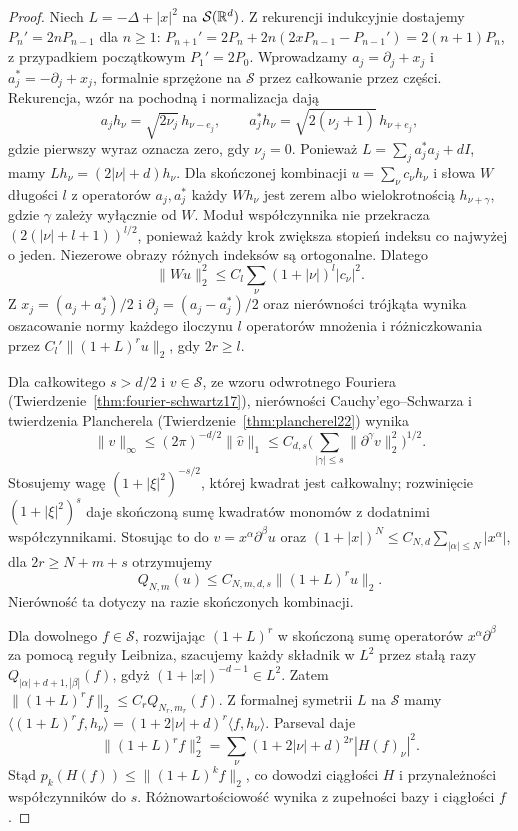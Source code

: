 \begin{proof}
Niech $L=-\Delta+|x|^2$ na $\mathcal S(\mathbb R^d)$.
Z rekurencji indukcyjnie dostajemy $P_n'=2nP_{n-1}$ dla $n\ge1$:
$P_{n+1}'=2P_n+2n(2xP_{n-1}-P_{n-1}')=2(n+1)P_n$,
z przypadkiem początkowym $P_1'=2P_0$.
Wprowadzamy $a_j=\partial_j+x_j$ i $a_j^*=-\partial_j+x_j$,
formalnie sprzężone na $\mathcal S$ przez całkowanie przez części.
Rekurencja, wzór na pochodną i normalizacja dają
\[
 a_jh_\nu=\sqrt{2\nu_j}\,h_{\nu-e_j},\qquad
 a_j^*h_\nu=\sqrt{2(\nu_j+1)}\,h_{\nu+e_j},
\]
gdzie pierwszy wyraz oznacza zero, gdy $\nu_j=0$.
Ponieważ $L=\sum_j a_j^*a_j+dI$, mamy
$Lh_\nu=(2|\nu|+d)h_\nu$.
Dla skończonej kombinacji $u=\sum_\nu c_\nu h_\nu$
i słowa $W$ długości $l$ z operatorów $a_j,a_j^*$
każdy $Wh_\nu$ jest zerem albo wielokrotnością
$h_{\nu+\gamma}$, gdzie $\gamma$ zależy wyłącznie od $W$.
Moduł współczynnika nie przekracza
$(2(|\nu|+l+1))^{l/2}$, ponieważ każdy krok zwiększa
stopień indeksu co najwyżej o jeden.
Niezerowe obrazy różnych indeksów są ortogonalne.
Dlatego
\[
 \|Wu\|_2^2\le C_l\sum_\nu(1+|\nu|)^l|c_\nu|^2.
\]
Z $x_j=(a_j+a_j^*)/2$ i $\partial_j=(a_j-a_j^*)/2$
oraz nierówności trójkąta wynika oszacowanie normy
każdego iloczynu $l$ operatorów mnożenia i różniczkowania
przez $C_l'\|(1+L)^r u\|_2$, gdy $2r\ge l$.

Dla całkowitego $s>d/2$ i $v\in\mathcal S$, ze wzoru
odwrotnego Fouriera (Twierdzenie~\ref{thm:fourier-schwartz17}),
nierówności Cauchy'ego--Schwarza i twierdzenia
Plancherela (Twierdzenie~\ref{thm:plancherel22}) wynika
\[
 \|v\|_\infty\le (2\pi)^{-d/2}\|\widehat v\|_1
 \le C_{d,s}\Big(\sum_{|\gamma|\le s}
 \|\partial^\gamma v\|_2^2\Big)^{1/2}.
\]
Stosujemy wagę $(1+|\xi|^2)^{-s/2}$, której kwadrat
jest całkowalny; rozwinięcie $(1+|\xi|^2)^s$ daje
skończoną sumę kwadratów monomów z dodatnimi współczynnikami.
Stosując to do $v=x^\alpha\partial^\beta u$ oraz
$(1+|x|)^N\le C_{N,d}\sum_{|\alpha|\le N}|x^\alpha|$,
dla $2r\ge N+m+s$ otrzymujemy
\[
 Q_{N,m}(u)\le C_{N,m,d,s}\|(1+L)^r u\|_2.
\]
Nierówność ta dotyczy na razie skończonych kombinacji.

Dla dowolnego $f\in\mathcal S$, rozwijając $(1+L)^r$
w skończoną sumę operatorów $x^\alpha\partial^\beta$
za pomocą reguły Leibniza, szacujemy każdy składnik
w $L^2$ przez stałą razy $Q_{|\alpha|+d+1,|\beta|}(f)$,
gdyż $(1+|x|)^{-d-1}\in L^2$.
Zatem $\|(1+L)^r f\|_2\le C_r Q_{N_r,m_r}(f)$.
Z formalnej symetrii $L$ na $\mathcal S$ mamy
$\langle(1+L)^r f,h_\nu\rangle
=(1+2|\nu|+d)^r\langle f,h_\nu\rangle$.
Parseval daje
\[
 \|(1+L)^r f\|_2^2
 =\sum_\nu(1+2|\nu|+d)^{2r}|H(f)_\nu|^2.
\]
Stąd $p_k(H(f))\le\|(1+L)^k f\|_2$, co dowodzi
ciągłości $H$ i przynależności współczynników do $s$.
Różnowartościowość wynika z zupełności bazy i ciągłości $f$.


\end{proof}
